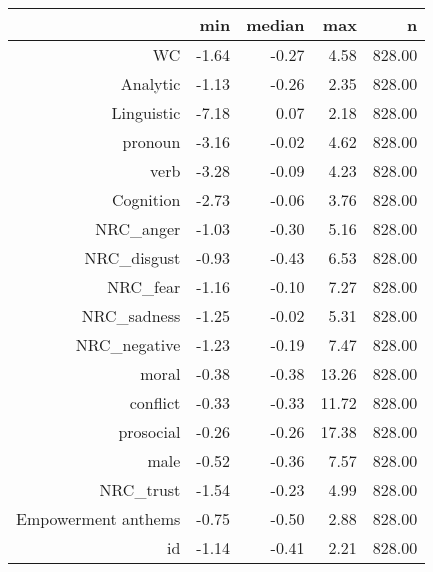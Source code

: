 \begin{table}[ht]
\centering
\begin{tabular}{rrrrr}
  \hline
 & min & median & max & n \\ 
  \hline
WC & -1.64 & -0.27 & 4.58 & 828.00 \\ 
  Analytic & -1.13 & -0.26 & 2.35 & 828.00 \\ 
  Linguistic & -7.18 & 0.07 & 2.18 & 828.00 \\ 
  pronoun & -3.16 & -0.02 & 4.62 & 828.00 \\ 
  verb & -3.28 & -0.09 & 4.23 & 828.00 \\ 
  Cognition & -2.73 & -0.06 & 3.76 & 828.00 \\ 
  NRC\_anger & -1.03 & -0.30 & 5.16 & 828.00 \\ 
  NRC\_disgust & -0.93 & -0.43 & 6.53 & 828.00 \\ 
  NRC\_fear & -1.16 & -0.10 & 7.27 & 828.00 \\ 
  NRC\_sadness & -1.25 & -0.02 & 5.31 & 828.00 \\ 
  NRC\_negative & -1.23 & -0.19 & 7.47 & 828.00 \\ 
  moral & -0.38 & -0.38 & 13.26 & 828.00 \\ 
  conflict & -0.33 & -0.33 & 11.72 & 828.00 \\ 
  prosocial & -0.26 & -0.26 & 17.38 & 828.00 \\ 
  male & -0.52 & -0.36 & 7.57 & 828.00 \\ 
  NRC\_trust & -1.54 & -0.23 & 4.99 & 828.00 \\ 
  Empowerment anthems & -0.75 & -0.50 & 2.88 & 828.00 \\ 
  id & -1.14 & -0.41 & 2.21 & 828.00 \\ 
   \hline
\end{tabular}
\end{table}
